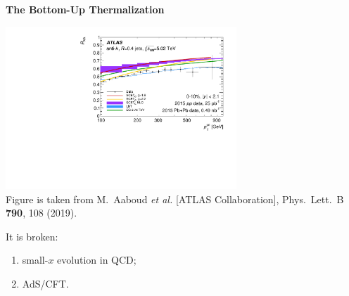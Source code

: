 \documentclass[9pt,a4paper,unknownkeysallowed,xcolor=dvipsnames,aspectratio=43]{beamer}
\begin{document}
%
%
\setcounter{page}{5}
\begin{frame}{\bf\huge The Bottom-Up Thermalization}	\vspace{4mm}
\begin{center}
\includegraphics[width=0.65\textwidth]{fig/RAA_jet}\\
{\tiny  Figure is taken from {\color{teablue}
M.~Aaboud {\it et al.} [ATLAS Collaboration],
  Phys.\ Lett.\ B {\bf 790}, 108 (2019).
  }}
\end{center}
\vspace{4mm}
{\large It is broken:}
\vspace{2mm}
\begin{enumerate}
\item{small-$x$ evolution in QCD;}
\vspace{4mm}
\item{AdS/CFT.}
\end{enumerate}
\end{frame}
\end{document}
